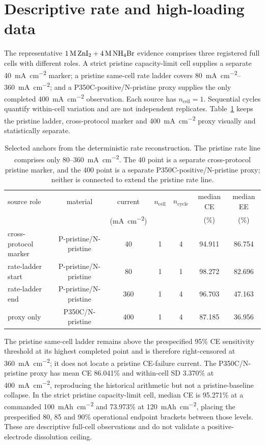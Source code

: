\documentclass[11pt]{article}
\begin{document}
\section{Descriptive rate and high-loading data}\label{sec:ratedata}
The representative $1\,\si{M}\,\ce{ZnI2}+4\,\si{M}\,\ce{NH4Br}$ evidence comprises three registered
full cells with different roles. A strict pristine capacity-limit cell supplies a separate
\SI{40}{mA.cm^{-2}} marker; a pristine same-cell rate ladder covers
\SIrange{80}{360}{mA.cm^{-2}}; and a P350C-positive/N-pristine proxy supplies the only completed
\SI{400}{mA.cm^{-2}} observation. Each source has $n_{\mathrm{cell}}=1$. Sequential cycles quantify
within-cell variation and are not independent replicates.
Table~\ref{tab:ratedata} keeps the pristine ladder, cross-protocol marker and 400~\si{mA.cm^{-2}} proxy
visually and statistically separate.

\begin{table}[h]\centering\small
\caption{Selected anchors from the deterministic rate reconstruction. The pristine rate line comprises
only 80--\SI{360}{mA.cm^{-2}}. The 40 point is a separate cross-protocol pristine marker, and the 400 point
is a separate P350C-positive/N-pristine proxy; neither is connected to extend the pristine rate line.}
\label{tab:ratedata}
\begin{tabular}{lcccccc}
\toprule
source role & material & current & $n_{\mathrm{cell}}$ & $n_{\mathrm{cycle}}$ & median CE & median EE \\
& & (\si{mA.cm^{-2}}) & & & (\%) & (\%) \\
\midrule
cross-protocol marker & P-pristine/N-pristine & 40 & 1 & 4 & 94.911 & 86.754 \\
rate-ladder start & P-pristine/N-pristine & 80 & 1 & 1 & 98.272 & 82.696 \\
rate-ladder end & P-pristine/N-pristine & 360 & 1 & 4 & 96.703 & 47.163 \\
proxy only & P350C/N-pristine & 400 & 1 & 4 & 87.185 & 36.956 \\
\bottomrule
\end{tabular}
\end{table}

The pristine same-cell ladder remains above the prespecified 95\% CE sensitivity threshold at its highest
completed point and is therefore right-censored at \SI{360}{mA.cm^{-2}}; it does not locate a pristine
CE-failure current. The P350C/N-pristine proxy has mean CE 86.041\% and within-cell SD 3.370\% at
\SI{400}{mA.cm^{-2}}, reproducing the historical arithmetic but not a pristine-baseline collapse. In the
strict pristine capacity-limit cell, median CE is 95.271\% at a commanded
\SI{100}{mAh.cm^{-2}} and 73.973\% at \SI{120}{mAh.cm^{-2}}, placing the prespecified 80, 85 and 90\%
operational endpoint brackets between those levels. These are descriptive full-cell observations and do not
validate a positive-electrode dissolution ceiling.
\end{document}
